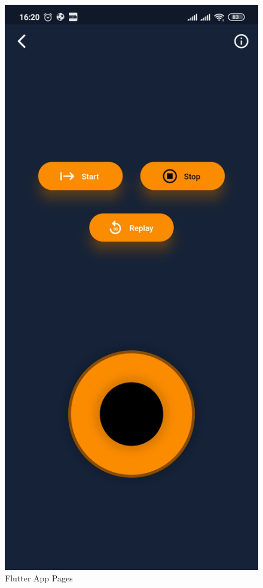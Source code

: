 \begin{figure}[H]
    \includegraphics[scale = 0.2]{Figures/flutterThree.jpg}
    \caption{Flutter App Pages}
    \label{fig:flutterPages}
\end{figure}









